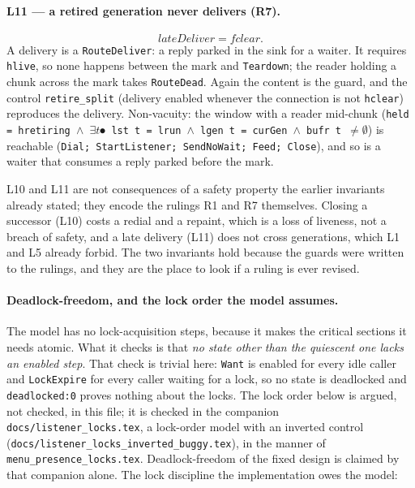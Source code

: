 \documentclass[a4paper,10pt,fleqn]{article}
\begin{document}
\paragraph{L11 --- a retired generation never delivers (R7).}
\[ lateDeliver = fclear. \]
A delivery is a \texttt{RouteDeliver}: a reply parked in the sink for a waiter.
It requires \texttt{hlive}, so none happens between the mark and
\texttt{Teardown}; the reader holding a chunk across the mark takes
\texttt{RouteDead}.  Again the content is the guard, and the control
\texttt{retire\_split} (delivery enabled whenever the connection is not
\texttt{hclear}) reproduces the delivery.  Non-vacuity: the window with a
reader mid-chunk (\texttt{held = hretiring $\land$ $\exists t \spot$ lst\,t =
lrun $\land$ lgen\,t = curGen $\land$ bufr\,t $\ne \emptyset$}) is reachable
(\texttt{Dial; StartListener; SendNoWait; Feed; Close}), and so is a waiter
that consumes a reply parked before the mark.

L10 and L11 are not consequences of a safety property the earlier invariants
already stated; they encode the rulings R1 and R7 themselves.  Closing a
successor (L10) costs a redial and a repaint, which is a loss of liveness, not
a breach of safety, and a late delivery (L11) does not cross generations, which
L1 and L5 already forbid.  The two invariants hold because the guards were
written to the rulings, and they are the place to look if a ruling is ever
revised.

\paragraph{Deadlock-freedom, and the lock order the model assumes.}
The model has no lock-acquisition steps, because it makes the critical
sections it needs atomic.  What it checks is that \emph{no state other than
the quiescent one lacks an enabled step}.  That check is trivial here:
\texttt{Want} is enabled for every idle caller and \texttt{LockExpire} for every
caller waiting for a lock, so no state is deadlocked and \texttt{deadlocked:0}
proves nothing about the locks.  The lock order below is argued, not checked, in
this file; it is checked in the companion \texttt{docs/listener\_locks.tex}, a
lock-order model with an inverted control
(\texttt{docs/listener\_locks\_inverted\_buggy.tex}), in the manner of
\texttt{menu\_presence\_locks.tex}.  Deadlock-freedom of the fixed design is
claimed by that companion alone.  The lock discipline the
implementation owes the model:
\end{document}
